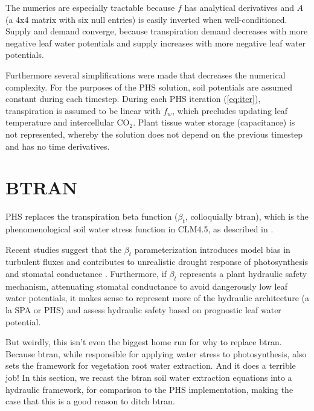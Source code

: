 \documentclass[draft,linenumbers]{agujournal}
\begin{document}
    The numerics are especially tractable because $f$ has analytical derivatives and $A$ 
    (a 4x4 matrix with six null entries) is easily inverted when well-conditioned. 
    Supply and demand converge, because transpiration demand decreases with more negative 
    leaf water potentials and supply increases with more negative leaf water potentials.
    
    Furthermore several simplifications were made that decreases the numerical complexity.
    For the purposes of the PHS solution, soil potentials are assumed constant during each timestep.
    During each PHS iteration (\ref{eq:iter}), transpiration is assumed to be linear with $f_w$,
    which precludes updating leaf temperature and intercellular CO$_2$.
    Plant tissue water storage (capacitance) is not represented, whereby the solution does not
    depend on the previous timestep and has no time derivatives.

    
    
    

\section{BTRAN}
\label{sect:btran}
    PHS replaces the transpiration beta function ($\beta_t$, colloquially btran), 
    which is the phenomenological soil water stress function in CLM4.5,
    as described in \citet{oleson2013,sellers1996a,sellers1996b}.
    
    Recent studies suggest that the $\beta_t$ parameterization introduces model bias in turbulent fluxes \citep{bonan2014}
    and contributes to unrealistic drought response of photosynthesis and stomatal conductance  \citep{powell2013}.
    Furthermore, if $\beta_t$ represents a plant hydraulic safety mechanism, attenuating stomatal conductance to avoid
    dangerously low leaf water potentials, it makes sense to represent more of the hydraulic architecture (a la SPA or PHS)
    and assess hydraulic safety based on prognostic leaf water potential.
    
    But weirdly, this isn't even the biggest home run for why to replace btran. Because btran, while responsible for applying
    water stress to photosynthesis, also sets the framework for vegetation root water extraction. And it does a terrible job!
    In this section, we recast the btran soil water extraction equations into a hydraulic framework, for comparison to the PHS implementation, making the case that this is a good reason to ditch btran.
    
\end{document}
